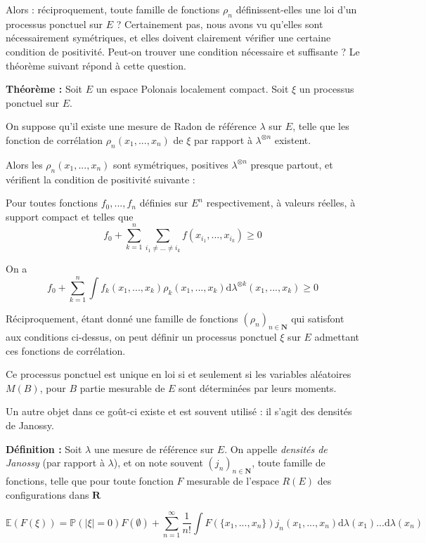 \documentclass[12pt]{article}
\let\oldsum\sum
\renewcommand{\sum}{\oldsum\limits}
\begin{document}
\begin{itemize}
Alors : réciproquement, toute famille de fonctions $ \rho_n $ définissent-elles une loi d'un processus ponctuel sur $E$ ? Certainement pas, nous avons vu qu'elles sont nécessairement symétriques, et elles doivent clairement vérifier une certaine condition de positivité. Peut-on trouver une condition nécessaire et suffisante ? Le théorème suivant répond à cette question.

\end{itemize}

\textbf{Théorème :} Soit $E$ un espace Polonais localement compact. Soit $ \xi $ un processus ponctuel sur $E$. 

On suppose qu'il existe une mesure de Radon de référence $ \lambda $ sur $ E $, telle que les fonction de corrélation $ \rho_n(x_1,...,x_n) $ de $ \xi $ par rapport à $ \lambda^{\otimes n} $ existent.

Alors les $ \rho_n(x_1,...,x_n) $ sont symétriques, positives $ \lambda^{\otimes n} $ presque partout, et vérifient la condition de positivité suivante : 

Pour toutes fonctions $f_0,...,f_n $ définies sur $ E^n $ respectivement, à valeurs réelles, à support compact et telles que $$  f_0 + \sum_{k=1}^n \sum_{i_1 \neq ... \neq i_k} f(x_{i_1}, ..., x_{i_k}) \geqslant 0 $$

On a $$ f_0 + \sum_{k=1}^n \int f_k(x_1,...,x_k) \rho_k(x_1,...,x_k) \mathrm d \lambda^{\otimes k}(x_1,...,x_k) \geqslant 0 $$

Réciproquement, étant donné une famille de fonctions $ (\rho_n)_{n \in \mathbf N} $ qui satisfont aux conditions ci-dessus, on peut définir un processus ponctuel $ \xi $ sur $ E $ admettant ces fonctions de corrélation. 

Ce processus ponctuel est unique en loi si et seulement si les variables aléatoires $ M(B) $, pour $ B $ partie mesurable de $E$ sont déterminées par leurs moments.

\bigskip

Un autre objet dans ce goût-ci existe et est souvent utilisé : il s'agit des densités de Janossy.

\textbf{Définition :} Soit $ \lambda $ une mesure de référence sur $E$. On appelle \textit{densités de Janossy} (par rapport à $ \lambda $), et on note souvent $ (j_n)_{n \in \mathbf N} $, toute famille de fonctions, telle que pour toute fonction $ F $ mesurable de l'espace $R(E) $ des configurations dans $ \mathbf R $

$$ \mathbb E(F(\xi)) = \mathbb P( |\xi| = 0) F(\emptyset) + \sum_{n=1}^\infty \frac{1}{n!} \int F(\{ x_1, ..., x_n \}) j_n(x_1,...,x_n) \mathrm d\lambda(x_1)... \mathrm d\lambda(x_n) $$
\end{document}
